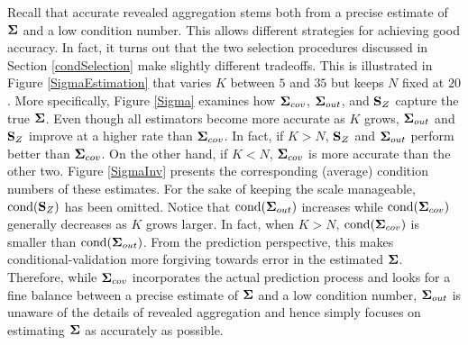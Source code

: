 \documentclass[11pt]{article}
\theoremstyle{definition}
\theoremstyle{definition}
\def\bSigma{{\bf \Sigma}}
\def\SS{{\bf S}}
\def\cond{\text{cond}}
\begin{document}
Recall  that accurate revealed aggregation stems both from a precise estimate of $\bSigma$ and a low condition number. This allows different strategies for achieving good accuracy. In fact, it turns out that the two selection procedures discussed in Section \ref{condSelection} make slightly different tradeoffs. This is illustrated in  Figure \ref{SigmaEstimation} that varies $K$ between $5$ and $35$ but keeps $N$ fixed at $20$. More specifically,  Figure \ref{Sigma} examines how $\bSigma_{cov}$,  $\bSigma_{out}$, and $\SS_Z$ capture the true $\bSigma$. 
Even though all estimators become more accurate as $K$ grows, $\bSigma_{out}$ and $\SS_Z$ improve at a higher rate than $\bSigma_{cov}$.  In fact, if $K > N$, $\SS_Z$ and $\bSigma_{out}$ perform better than $\bSigma_{cov}$. On the other hand, if $K < N$, $\bSigma_{cov}$ is more accurate than the other two. Figure \ref{SigmaInv}  presents the corresponding (average) condition numbers of these estimates. For the sake of keeping the scale manageable, $\cond(\SS_Z)$ has been omitted. Notice that $\cond(\bSigma_{out})$ increases while $\cond(\bSigma_{cov})$ generally decreases as $K$ grows larger. In fact, when $K > N$,  $\cond(\bSigma_{cov})$ is smaller than $\cond(\bSigma_{out})$. From the prediction perspective, this makes conditional-validation more forgiving towards error in the estimated $\bSigma$. Therefore, while $\bSigma_{cov}$ incorporates the actual prediction process and looks for a fine balance between a precise estimate of $\bSigma$ and a low condition number, $\bSigma_{out}$ is unaware of the details of revealed aggregation and hence simply focuses on estimating $\bSigma$ as accurately as possible. 



\end{document}
